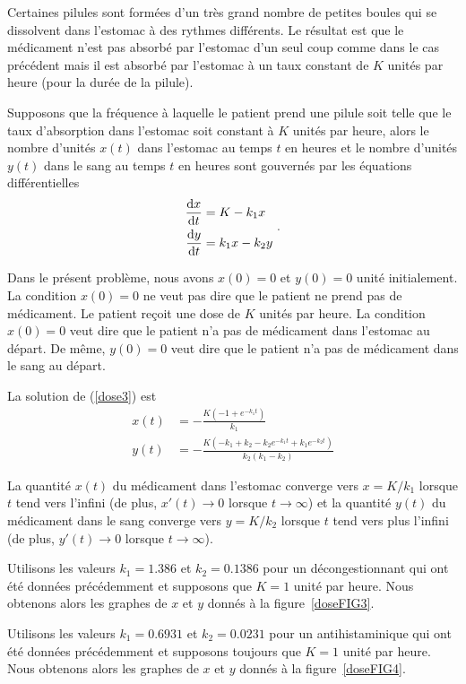 {\begin{egg}
Certaines pilules sont formées d'un très grand nombre de petites boules qui se
dissolvent dans l'estomac à des rythmes différents.  Le résultat est que le
médicament n'est pas absorbé par l'estomac d'un seul coup comme dans le cas
précédent mais il est absorbé par l'estomac à un taux constant de $K$
unités par heure (pour la durée de la pilule).

Supposons que la fréquence à laquelle le patient prend une pilule soit
telle que le taux d'absorption dans l'estomac soit constant à $K$ unités par
heure, alors le nombre d'unités $x(t)$ dans l'estomac au temps $t$ en heures
et le nombre d'unités $y(t)$ dans le sang au temps $t$ en heures sont
gouvernés par les équations différentielles
\begin{equation} \label{dose3}
\begin{split}
\frac{\mathrm{d}x}{\mathrm{d}t} &= K -k_1 x \\
\frac{\mathrm{d}y}{\mathrm{d}t} &= k_1 x - k_2 y
\end{split} \ .
\end{equation}

Dans le présent problème, nous avons $x(0)=0$ et $y(0)=0$ unité
initialement.  La condition $x(0)=0$ ne veut pas dire que le patient
ne prend pas de médicament.  Le patient reçoit une dose de $K$ unités par
heure.  La condition $x(0)=0$ veut dire que le patient n'a pas de
médicament dans l'estomac au départ.  De même, $y(0)=0$ veut dire que
le patient n'a pas de médicament dans le sang au départ.

La solution de (\ref{dose3}) est
\begin{align*}
x(t) &= -\frac{K\left(-1 + e^{-k_1 t}\right)}{k_1} \\
y(t) &= -\frac{K\left(-k_1 + k_2 - k_2 e^{-k_1 t} + k_1 e^{-k_2
      t}\right)}{k_2 (k_1 - k_2)}
\end{align*}

La quantité $x(t)$ du médicament dans l'estomac converge vers
$x = K/k_1$ lorsque $t$ tend vers l'infini (de plus,
$x'(t) \rightarrow 0$ lorsque $t \rightarrow \infty$) et la quantité $y(t)$
du médicament dans le sang converge vers $y = K/k_2$ lorsque $t$
tend vers plus l'infini (de plus, $y'(t) \rightarrow 0$ lorsque
$t \rightarrow \infty$).

Utilisons les valeurs $k_1 = 1.386$ et $k_2 = 0.1386$ pour un
décongestionnant qui ont été données précédemment et supposons que
$K=1$ unité par heure.  Nous obtenons alors les graphes de $x$ et $y$ donnés
à la figure~\ref{doseFIG3}.

Utilisons les valeurs $k_1=0.6931$ et $k_2=0.0231$ pour un
antihistaminique qui ont été données précédemment et supposons
toujours que $K=1$ unité par heure.  Nous obtenons alors les graphes de $x$
et $y$ donnés à la figure~\ref{doseFIG4}.


\end{egg}}
